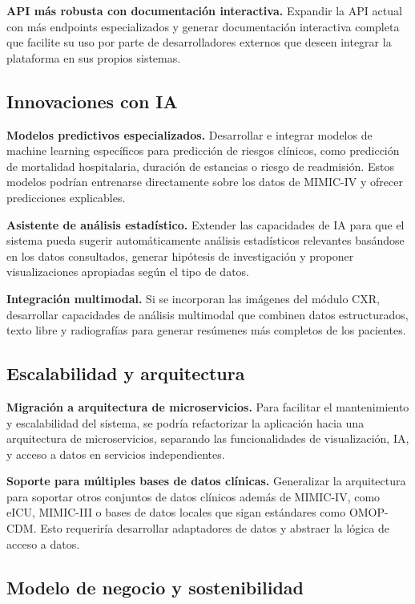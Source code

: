 \textbf{API más robusta con documentación interactiva.} Expandir la API actual con más endpoints especializados y generar documentación interactiva completa que facilite su uso por parte de desarrolladores externos que deseen integrar la plataforma en sus propios sistemas.

\subsection{Innovaciones con IA}

\textbf{Modelos predictivos especializados.} Desarrollar e integrar modelos de machine learning específicos para predicción de riesgos clínicos, como predicción de mortalidad hospitalaria, duración de estancias o riesgo de readmisión. Estos modelos podrían entrenarse directamente sobre los datos de MIMIC-IV y ofrecer predicciones explicables.

\textbf{Asistente de análisis estadístico.} Extender las capacidades de IA para que el sistema pueda sugerir automáticamente análisis estadísticos relevantes basándose en los datos consultados, generar hipótesis de investigación y proponer visualizaciones apropiadas según el tipo de datos.

\textbf{Integración multimodal.} Si se incorporan las imágenes del módulo CXR, desarrollar capacidades de análisis multimodal que combinen datos estructurados, texto libre y radiografías para generar resúmenes más completos de los pacientes.

\subsection{Escalabilidad y arquitectura}

\textbf{Migración a arquitectura de microservicios.} Para facilitar el mantenimiento y escalabilidad del sistema, se podría refactorizar la aplicación hacia una arquitectura de microservicios, separando las funcionalidades de visualización, IA, y acceso a datos en servicios independientes.

\textbf{Soporte para múltiples bases de datos clínicas.} Generalizar la arquitectura para soportar otros conjuntos de datos clínicos además de MIMIC-IV, como eICU, MIMIC-III o bases de datos locales que sigan estándares como OMOP-CDM. Esto requeriría desarrollar adaptadores de datos y abstraer la lógica de acceso a datos.

\subsection{Modelo de negocio y sostenibilidad}

